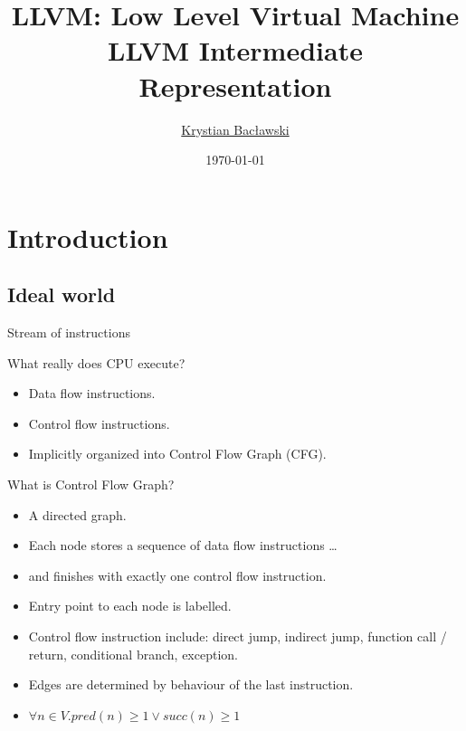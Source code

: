 \documentclass[8pt]{beamer}
\title[LLVM]{LLVM: Low Level Virtual Machine\\LLVM Intermediate Representation}
\author[Krystian Bacławski]{\href{mailto:cahirwpz@cs.uni.wroc.pl}{Krystian Bacławski}}
\institute{Computer Science Department\\University of Wrocław}
\date{\today}
\begin{document}
\begin{frame}
\titlepage
\end{frame}

\section[Intro]{Introduction}
\subsection*{Ideal world}

\begin{frame}{Stream of instructions}
  \begin{block}{What really does CPU execute?}
    \begin{itemize}
      \item Data flow instructions.
      \item Control flow instructions.
      \item Implicitly organized into Control Flow Graph (CFG).
    \end{itemize}
  \end{block}

  \begin{block}{What is Control Flow Graph?}
    \begin{itemize}
      \item A directed graph.
      \item Each node stores a sequence of data flow instructions \ldots
      \item and finishes with exactly one control flow instruction.
      \item Entry point to each node is labelled.
      \item Control flow instruction include: direct jump, indirect jump,
        function call / return, conditional branch, exception.
      \item Edges are determined by behaviour of the last instruction.
      \item $\forall n \in V. pred(n) \ge 1 \lor succ(n) \ge 1$
    \end{itemize}
  \end{block}
\end{frame}
\end{document}
